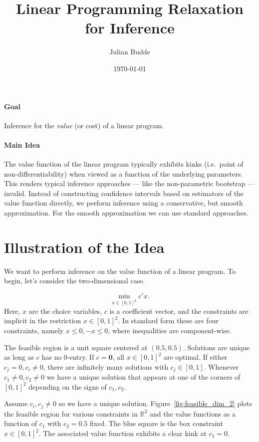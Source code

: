 \documentclass[11pt,a4paper,english]{article} %
\title{Linear Programming Relaxation for Inference}
\author{Julian Budde}
\date{\today}
\numberwithin{equation}{section}
\numberwithin{figure}{section}
\numberwithin{table}{section}
\theoremstyle{definition}
\theoremstyle{remark}
\begin{document}
\maketitle

\paragraph{Goal} Inference for the \textit{value} (or cost) of a linear program.

\paragraph{Main Idea} The value function of the linear program typically exhibits kinks (i.e.~point of non-differentiability) when viewed as a function of the underlying parameters.
This renders typical inference approaches --- like the non-parametric bootstrap --- invalid.
Instead of constructing confidence intervals based on estimators of the value function directly, we perform inference using a conservative, but smooth approximation.
For the smooth approximation we can use standard approaches.

\section{Illustration of the Idea}

We want to perform inference on the value function of a linear program.
To begin, let's consider the two-dimensional case.

\begin{equation}
	\min_{x\in [0,1]^2} c'x.
\end{equation}
Here, $x$ are the choice variables, $c$ is a coefficient vector, and the constraints are implicit in the restriction $x \in [0,1]^2$.
In standard form these are four constraints, namely $x \leq 0, -x \leq 0$, where inequalities are component-wise.

The feasible region is a unit square centered at $(0.5, 0.5)$. Solutions are unique as long as $c$ has no $0$-entry.
If $c=\mathbf{0}$, all $x\in [0,1]^2$ are optimal. If either $c_j = 0, c_i\neq0$, there are infinitely many solutions with $c_j \in [0,1]$.
Whenever $c_1\neq0, c_2\neq0$ we have a unique solution that appears at one of the corners of $[0,1]^2$ depending on the signs of $c_1, c_2$.

Assume $c_i, c_j \neq 0$ so we have a unique solution.
Figure~\ref{fig:feasible_dim_2} plots the feasible region for various constraints in $\mathbb{R}^2$ and the value functions as a function of $c_1$ with $c_2=0.5$ fixed.
The blue square is the box constraint $x\in[0,1]^2$.
The associated value function exhibits a clear kink at $c_1 = 0$.
\end{document}
